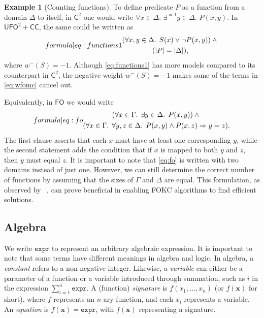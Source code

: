\documentclass[letterpaper]{article} %
\theoremstyle{remark}
\theoremstyle{definition}
\newtheorem{example}{Example}
\newcommand{\expr}{\mathtt{expr}}
\newcommand{\Ctwo}{$\mathsf{C}^{2}$}
\newcommand{\FO}{$\mathsf{FO}$}
\newcommand{\UFO}{$\mathsf{UFO}^{2} + \mathsf{CC}$}
\begin{document}
\begin{example}[Counting functions]\label{example:functions}
  To define predicate $P$ as a function from a domain $\Delta$ to itself, in
  \Ctwo{} one would write $\forall x \in \Delta\text{.
  }\exists^{=1} y \in \Delta\text{. }P(x, y)$. In \UFO{}, the same could be
  written as
  \begin{equation}\label[formula]{eq:functions1}
    \begin{gathered}
      (\forall x, y \in \Delta\text{. }S(x) \lor \neg P(x, y)) \land{}\\
      (|P| = |\Delta|),
    \end{gathered}
  \end{equation}
  where $w^{-}(S) = -1$. Although \cref{eq:functions1} has more models compared
  to its counterpart in \Ctwo{}, the negative weight $w^{-}(S) = -1$ makes some
  of the terms in \cref{eq:wfomc} cancel out.

  Equivalently, in \FO{} we would write
  \begin{equation}\label[formula]{eq:fo}
    \begin{gathered}
      (\forall x \in \Gamma\text{. }\exists y \in \Delta\text{. }P(x, y)) \land{}\\
      (\forall x \in \Gamma\text{. }\forall y, z \in \Delta\text{. }P(x, y) \land P(x, z) \Rightarrow y = z).
    \end{gathered}
  \end{equation}
  The first clause asserts that each $x$ must have at least one corresponding
  $y$, while the second statement adds the condition that if $x$ is mapped to
  both $y$ and $z$, then $y$ must equal $z$. It is important to note that
  \cref{eq:fo} is written with two domains instead of just one. However, we can
  still determine the correct number of functions by assuming that the sizes of
  $\Gamma$ and $\Delta$ are equal. This formulation, as observed by
  \citeauthor{DBLP:conf/kr/DilkasB23}~, can
  prove beneficial in enabling FOKC algorithms to find efficient solutions.
\end{example}

\subsection{Algebra}\label{sec:algebra}

We write $\expr{}$ to represent an arbitrary algebraic expression. It is
important to note that some terms have different meanings in algebra and
logic. In algebra, a \emph{constant} refers to a non-negative integer. Likewise,
a \emph{variable} can either be a parameter of a function or a variable
introduced through summation, such as $i$ in the expression
$\sum_{i=1}^{n} \expr$. A (function) \emph{signature} is
$f(x_{1}, \dots, x_{n})$ (or $f(\mathbf{x})$ for short), where $f$ represents an
$n$-ary function, and each $x_{i}$ represents a variable. An \emph{equation} is
$f(\mathbf{x}) = \expr{}$, with $f(\mathbf{x})$ representing a signature.
\end{document}

